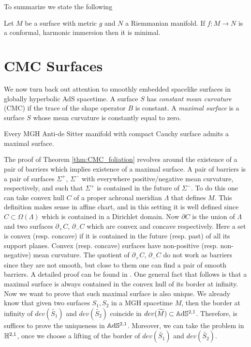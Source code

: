 To summarize we state the following
\begin{theorem}\label{thm:minimal}
    Let $M$ be a surface with metric $g$ and $N$ a Riemmanian manifold. If $f: M \to N$ is a conformal, harmonic immersion then it is minimal.
\end{theorem}

\section{CMC Surfaces}
We now turn back out attention to smoothly embedded spacelike surfaces in globally hyperbolic AdS spacetime. A surface $S$ has \textit{constant mean curvature} (CMC) if the trace of the shape operator $B$ is constant. A \textit{maximal surface} is a surface $S$ whose mean curvature is constantly equal to zero.
\begin{theorem}\label{thm:CMC_foliation}
    Every MGH Anti-de Sitter manifold with compact Cauchy surface admits a maximal surface.
\end{theorem}
The proof of Theorem \ref{thm:CMC_foliation} revolves around the existence of a pair of barriers which implies existence of a maximal surface. A pair of barriers is a pair of surfaces $\Sigma^+$, $\Sigma^-$ with everywhere positive/negative mean curvature, respectively, and such that $\Sigma^+$ is contained in the future of $\Sigma^-$.
To do this one can take convex hull $C$ of a proper achronal meridian $\Lambda$ that defines $M$. This definition makes sense in affine chart, and in this setting it is well defined since $C \subset \Omega(\Lambda)$ which is contained in a Dirichlet domain. Now $\partial C$ is the union of $\Lambda$ and two surfaces $\partial_+ C$, $\partial_- C$ which are convex and concave respectively. Here a set is convex (resp. concave) if it is contained in the future (resp. past) of all its support planes. Convex (resp. concave) surfaces have non-positive (resp. non-negative) mean curvature. The quotient of $\partial_+ C$, $\partial_- C$ do not work as barriers since they are not smooth, but close to them one can find a pair of smooth barriers.
A detailed proof can be found in \cite{barbot2004constant}. One general fact that follows is that a maximal surface is always contained in the convex hull of its border at infinity.\\
Now we want to prove that such maximal surface is also unique. We already know that given two surfaces $S_1, S_2$ in a MGH spacetime $M$, then the border at infinity of $dev(\widetilde{S_1})$ and $dev(\widetilde{S_2})$ coincide in $dev(\widetilde{M})\subset \mathbb{A}\mathrm{d}\mathbb{S}^{2,1}$. Therefore, is suffices to prove the uniqueness in $\mathbb{A}\mathrm{d}\mathbb{S}^{2,1}$. Moreover, we can take the problem in $\mathbb{H}^{2,1}$, once we choose a lifting of the border of $dev(\widetilde{S_1})$ and $dev(\widetilde{S_2})$.\\
